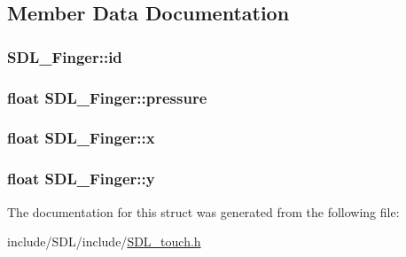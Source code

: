 \subsection{Member Data Documentation}
\hypertarget{struct_s_d_l___finger_a3cec630146eeec5bd6299a9387a6f16a}{
\subsubsection[{id}]{ S\-D\-L\-\_\-\-Finger\-::id}}\label{struct_s_d_l___finger_a3cec630146eeec5bd6299a9387a6f16a}
\hypertarget{struct_s_d_l___finger_a0ecb50c7fd699d59899ac60c941bdee6}{
\subsubsection[{pressure}]{\setlength{\rightskip}{0pt plus 5cm}float S\-D\-L\-\_\-\-Finger\-::pressure}}\label{struct_s_d_l___finger_a0ecb50c7fd699d59899ac60c941bdee6}
\hypertarget{struct_s_d_l___finger_ab91dfbd03c3215560457fef44e1c7755}{
\subsubsection[{x}]{\setlength{\rightskip}{0pt plus 5cm}float S\-D\-L\-\_\-\-Finger\-::x}}\label{struct_s_d_l___finger_ab91dfbd03c3215560457fef44e1c7755}
\hypertarget{struct_s_d_l___finger_a0a2c7a06ae641940111e03801c672cf9}{
\subsubsection[{y}]{\setlength{\rightskip}{0pt plus 5cm}float S\-D\-L\-\_\-\-Finger\-::y}}\label{struct_s_d_l___finger_a0a2c7a06ae641940111e03801c672cf9}


The documentation for this struct was generated from the following file\-:\begin{DoxyCompactItemize}
\item 
include/\-S\-D\-L/include/\hyperlink{_s_d_l__touch_8h}{S\-D\-L\-\_\-touch.\-h}\end{DoxyCompactItemize}
